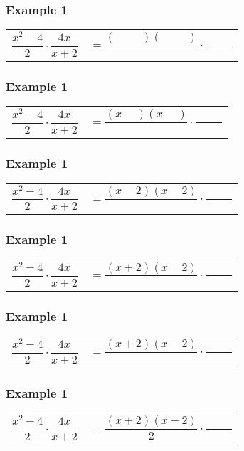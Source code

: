 \documentclass[14pt]{beamer}
\begin{document}
    \begin{frame}
	    \frametitle{Example 1}
	    \begin{tabular}{ll}
		$\dfrac{x^2 - 4}{2} \cdot \dfrac{4x}{x + 2}$ & \pause $ = \dfrac{(\phantom{x + 2} ) ( \phantom{x - 2})}{} \cdot \dfrac{}{\phantom{x + 2}}$ \\
	    \end{tabular}
    \end{frame}

    \begin{frame}
    	\frametitle{Example 1}
    	\begin{tabular}{ll}
    		$\dfrac{x^2 - 4}{2} \cdot \dfrac{4x}{x + 2}$ & $ = \dfrac{(x \phantom{ + 2} ) ( x \phantom{ - 2})}{} \cdot \dfrac{}{\phantom{x + 2}}$ \\
    	\end{tabular}
    \end{frame}

    \begin{frame}
    	\frametitle{Example 1}
    	\begin{tabular}{ll}
    		$\dfrac{x^2 - 4}{2} \cdot \dfrac{4x}{x + 2}$ & $ = \dfrac{(x \phantom{ + } 2 ) ( x \phantom{ - } 2)}{} \cdot \dfrac{}{\phantom{x + 2}}$ \\
    	\end{tabular}
    \end{frame}

    \begin{frame}
    	\frametitle{Example 1}
    	\begin{tabular}{ll}
    		$\dfrac{x^2 - 4}{2} \cdot \dfrac{4x}{x + 2}$ & $ = \dfrac{(x  + 2 ) ( x \phantom{ - } 2)}{} \cdot \dfrac{}{\phantom{x + 2}}$ \\
    	\end{tabular}
    \end{frame}

    \begin{frame}
    	\frametitle{Example 1}
    	\begin{tabular}{ll}
    		$\dfrac{x^2 - 4}{2} \cdot \dfrac{4x}{x + 2}$ & $ = \dfrac{(x  + 2 ) ( x  -  2)}{} \cdot \dfrac{}{\phantom{x + 2}}$ \\
    	\end{tabular}
    \end{frame}

    \begin{frame}
    	\frametitle{Example 1}
    	\begin{tabular}{ll}
    		$\dfrac{x^2 - 4}{2} \cdot \dfrac{4x}{x + 2}$ & $ = \dfrac{(x  + 2 ) ( x  -  2)}{2} \cdot \dfrac{}{\phantom{x + 2}}$ \\
    	\end{tabular}
    \end{frame}
\end{document}
